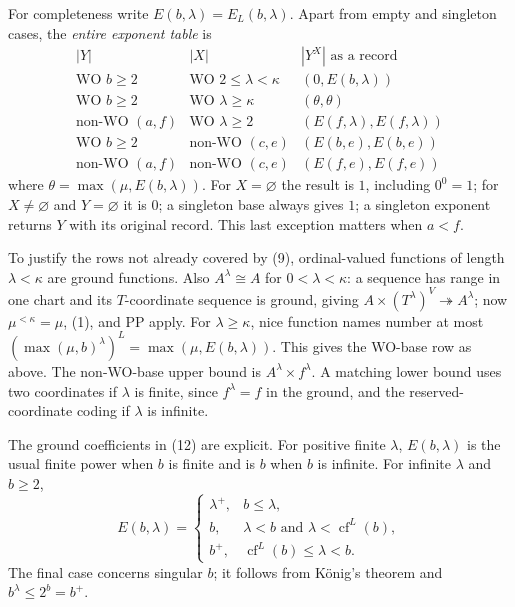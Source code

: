 For completeness write $E(b,\lambda)=E_L(b,\lambda)$. Apart from empty
and singleton cases, the \emph{entire exponent table} is
\[
\begin{array}{c|c|c}
 |Y|&|X|&|Y^X|\text{ as a record}\\ \hline
 \text{WO }b\geq2&\text{WO }2\leq\lambda<\kappa&(0,E(b,\lambda))\\
 \text{WO }b\geq2&\text{WO }\lambda\geq\kappa&(\theta,\theta)\\
 \text{non-WO }(a,f)&\text{WO }\lambda\geq2&(E(f,\lambda),E(f,\lambda))\\
 \text{WO }b\geq2&\text{non-WO }(c,e)&(E(b,e),E(b,e))\\
 \text{non-WO }(a,f)&\text{non-WO }(c,e)&(E(f,e),E(f,e))
\end{array}                                                       \tag{12}
\]
where $\theta=\max(\mu,E(b,\lambda))$.
For $X=\varnothing$ the result is $1$, including $0^0=1$;
for $X\ne\varnothing$ and $Y=\varnothing$ it is $0$;
a singleton base always gives $1$; a singleton exponent returns $Y$
with its original record. This last exception matters when $a<f$.

To justify the rows not already covered by (9), ordinal-valued functions
of length $\lambda<\kappa$ are ground functions. Also
$A^\lambda\cong A$ for $0<\lambda<\kappa$: a sequence has range in one
chart and its $T$-coordinate sequence is ground, giving
$A\times(T^\lambda)^V\twoheadrightarrow A^\lambda$; now
$\mu^{<\kappa}=\mu$, (1), and PP apply. For $\lambda\geq\kappa$,
nice function names number at most
$(\max(\mu,b)^\lambda)^L=\max(\mu,E(b,\lambda))$.
This gives the WO-base row as above. The non-WO-base upper bound is
$A^\lambda\times f^\lambda$. A matching lower bound uses two coordinates
if $\lambda$ is finite, since $f^\lambda=f$ in the ground, and the
reserved-coordinate coding if $\lambda$ is infinite.

The ground coefficients in (12) are explicit. For positive finite
$\lambda$, $E(b,\lambda)$ is the usual finite power when $b$ is finite
and is $b$ when $b$ is infinite. For infinite $\lambda$ and $b\geq2$,
\[
 E(b,\lambda)=
 \begin{cases}
  \lambda^+,&b\leq\lambda,\\
  b,&\lambda<b\text{ and }\lambda<\operatorname{cf}^L(b),\\
  b^+,&\operatorname{cf}^L(b)\leq\lambda<b.
 \end{cases}                                                     \tag{13}
\]
The final case concerns singular $b$; it follows from K\"onig's theorem
and $b^\lambda\leq2^b=b^+$.

